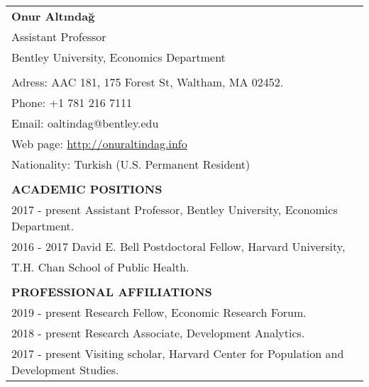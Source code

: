 \documentclass[12 pt]{article}
\begin{document}
\begin{longtable}{ccccc}



\multicolumn{5}{l}{\Large{\textbf{Onur Alt{\i}nda\u{g}}}}     \\


\multicolumn{5}{l}{Assistant Professor}    \\
\multicolumn{5}{l}{Bentley University, Economics Department}    \\
\\
\multicolumn{5}{l}{Adress: \phantom{0000} AAC 181, 175 Forest St, Waltham, MA 02452.}    \\
\multicolumn{5}{l}{Phone: \phantom{0000.}  +1 781 216 7111}    \\

\multicolumn{5}{l}{Email: \phantom{00000} oaltindag@bentley.edu}   \\
\multicolumn{5}{l}{Web page: \phantom{07} \url{http://onuraltindag.info}}   \\
\multicolumn{5}{l}{Nationality: \phantom{0} Turkish (U.S. Permanent Resident)}   \\


\\
\multicolumn{5}{l}{\textbf{ACADEMIC POSITIONS}}  \\[2 pt]
 \multicolumn{4}{l}{2017 - present \phantom{00} Assistant Professor, Bentley University, Economics Department.}  \\
 \multicolumn{4}{l}{2016 - 2017 \phantom{0000} David E. Bell Postdoctoral Fellow, Harvard University,}  \\
  \multicolumn{4}{l}{\phantom{2016 - 2017} \phantom{0000}  T.H. Chan School of Public Health.}  \\

\\

 \multicolumn{5}{l}{\textbf{PROFESSIONAL AFFILIATIONS}}  \\[2 pt]


   \multicolumn{4}{l}{2019 - present \phantom{00}Research Fellow, Economic Research Forum.}  \\



  \multicolumn{4}{l}{2018 - present \phantom{00}Research Associate, Development Analytics.}  \\
   \multicolumn{4}{l}{2017 - present \phantom{00}Visiting scholar, Harvard Center for Population and Development Studies.} \\ 


\end{longtable}
\end{document}
